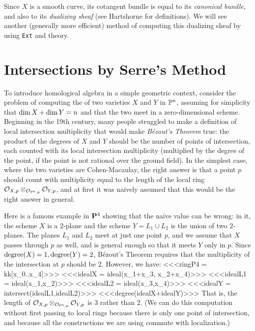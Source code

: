 Since $X$ is a smooth curve, its cotangent bundle is equal
to its {\it canonical bundle}, and also to its {\it dualizing sheaf} 
(see Hartshorne \cite[sections II.8 and III.7]{Hartshorne} 
{}for definitions).
We will
see another (generally more efficient) method of computing this
dualizing sheaf by using {\tt Ext} and  theory.

\goodbreak

\section{Intersections by Serre's Method}

%
To introduce homological algebra in a simple geometric context,
consider the problem of computing the 
of two varieties $X$ and $Y$ in $\P^n$, assuming for simplicity
that $\mathop{\rm dim} X +\mathop{\rm dim} Y = n$ and that the two
meet in a zero-dimensional scheme. Beginning in the
19th century, many people struggled to make a definition of
local intersection multiplicity
that would make {\it B\'ezout's Theorem\/} true: the product 
of the degrees of $X$ and $Y$ should be the number of points
of intersection, each counted with its local intersection multiplicity
(multiplied by the degree of the point, if the point is not
rational over the ground field).
In the simplest case, where the two varieties are Cohen-Macaulay,
the right answer is that a point $p$ should count with multiplicity
equal to the length of the local ring 
$\cO_{X,p}\otimes_{\cO_{\P^n,p}} \cO_{Y,p}$,
and at first it was naively assumed that this would be the right answer
in general. 

Here is a famous example in ${\bf P}^4$ showing that
the naive value can be wrong: in it, the scheme $X$ is a 2-plane
and the scheme $Y=L_1\cup L_2$ is the union of two 2-planes. 
The planes $L_1$ and $L_2$ meet at just one point $p$,
and we assume that $X$ passes through $p$ as well, and
is general enough so that it meets
$Y$ only in $p$.
Since $\mathop{\rm degree}(X) = 1, \mathop{\rm degree}(Y) = 2$, 
B\'ezout's Theorem requires that
the multiplicity of the intersection at $p$ should be 2. 
However, we have:
<<<ringP4 = kk[x_0..x_4]>>>
<<<idealX = ideal(x_1+x_3, x_2+x_4)>>>
<<<idealL1 = ideal(x_1,x_2)>>>
<<<idealL2 = ideal(x_3,x_4)>>>
<<<idealY = intersect(idealL1,idealL2)>>>
<<<degree(idealX+idealY)>>>
That is, 
the length of 
$\cO_{X,p}\otimes_{\cO_{\P^n,p}} \cO_{Y,p}$
is 3 rather than 2. (We can do this computation
without first passing to local rings because there
is only one point of intersection, and because all the
constructions we are using commute with localization.)

